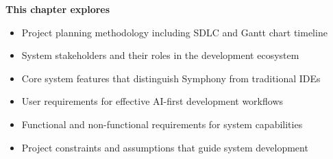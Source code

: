 \begin{tcolorbox}[
    enhanced,
    colback=white,
    colframe=brandSecondary!40,
    boxrule=1pt,
    arc=12pt,
    drop shadow={brandSecondary!20},
    left=1.5cm,
    right=1.5cm,
    top=0.2cm,
    bottom=0.2cm,
    before upper={\parindent0pt}
]
\begin{center}
{\Large\textbf{\textcolor{brandSecondary}{This chapter explores}}}
\end{center}

\vspace{0.8cm}

\begin{itemize}[leftmargin=1.2cm, itemsep=0.4cm, label={\textcolor{brandAccent}{$\triangleright$}}]
    \item {\large Project planning methodology including SDLC and Gantt chart timeline}
    \item {\large System stakeholders and their roles in the development ecosystem}
    \item {\large Core system features that distinguish Symphony from traditional IDEs}
    \item {\large User requirements for effective AI-first development workflows}
    \item {\large Functional and non-functional requirements for system capabilities}
    \item {\large Project constraints and assumptions that guide system development}
\end{itemize}
\end{tcolorbox}

\clearpage
